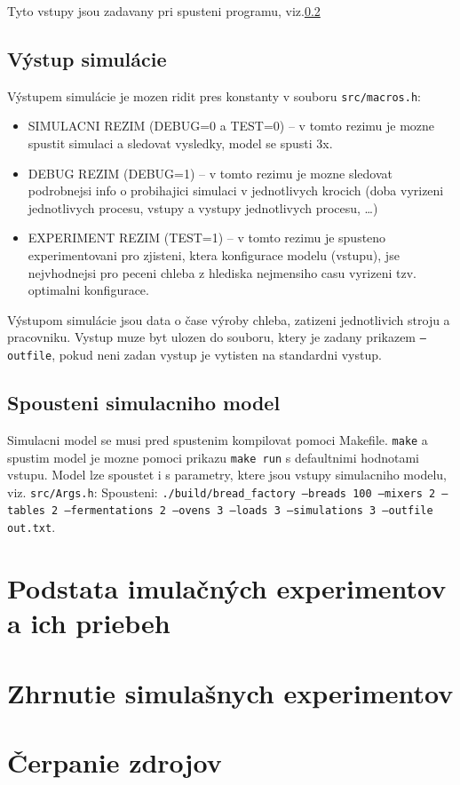 \documentclass[a4paper, 10pt]{article}
\begin{document}
    Tyto vstupy jsou zadavany pri spusteni programu, viz.\ref{subsec:spousteni-simulacniho-model}

    \subsection{Výstup simulácie}
    Výstupem simulácie je mozen ridit pres konstanty v souboru \texttt{src/macros.h}:
    \begin{itemize}
        \item SIMULACNI REZIM (DEBUG=0 a TEST=0) -- v tomto rezimu je mozne spustit simulaci a sledovat vysledky, model se spusti 3x.
        \item DEBUG REZIM (DEBUG=1) -- v tomto rezimu je mozne sledovat podrobnejsi info o probihajici simulaci
        v jednotlivych krocich (doba vyrizeni jednotlivych procesu, vstupy a vystupy jednotlivych procesu, \ldots)
        \item EXPERIMENT REZIM (TEST=1) -- v tomto rezimu je spusteno experimentovani pro zjisteni,
        ktera konfigurace modelu (vstupu), jse nejvhodnejsi pro peceni
        chleba z hlediska nejmensiho casu vyrizeni tzv. optimalni konfigurace.
    \end{itemize}

    Výstupom simulácie jsou data o čase výroby chleba, zatizeni jednotlivich stroju a pracovniku.
    Vystup muze byt ulozen do souboru, ktery je zadany prikazem \texttt{--outfile}, pokud neni zadan
    vystup je vytisten na standardni vystup.

    \subsection{Spousteni simulacniho model}\label{subsec:spousteni-simulacniho-model}
    Simulacni model se musi pred spustenim kompilovat pomoci Makefile.
    \texttt{make} a spustim model je mozne pomoci prikazu \texttt{make run} s defaultnimi hodnotami vstupu.
    Model lze spoustet i s parametry, ktere jsou vstupy simulacniho modelu, viz. \texttt{src/Args.h}:
    Spousteni: \texttt{./build/bread\_factory --breads 100 --mixers 2 --tables 2
    --fermentations 2 --ovens 3 --loads 3 --simulations 3 --outfile out.txt}.


    \section{Podstata imulačných experimentov a ich priebeh}


    \section{Zhrnutie simulašnych experimentov}

    \section {Čerpanie zdrojov}
    {\cite{example}}

    \newpage
    
    
\end{document}
